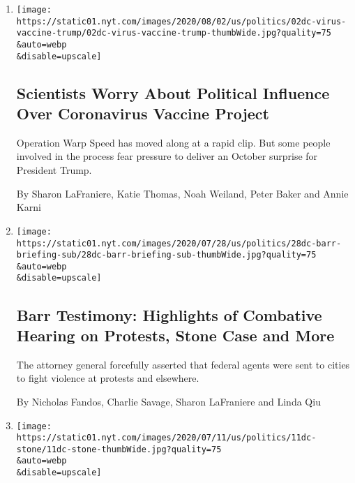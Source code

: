 \begin{enumerate}
\def\labelenumi{\arabic{enumi}.}
\item
  \href{/2020/08/02/us/politics/coronavirus-vaccine.html}{}

  \texttt{[image: https://static01.nyt.com/images/2020/08/02/us/politics/02dc-virus-vaccine-trump/02dc-virus-vaccine-trump-thumbWide.jpg?quality=75\\\&auto=webp\\\&disable=upscale]}

  \hypertarget{scientists-worry-about-political-influence-over-coronavirus-vaccine-project}{%
  \subsection{Scientists Worry About Political Influence Over
  Coronavirus Vaccine
  Project}\label{scientists-worry-about-political-influence-over-coronavirus-vaccine-project}}

  Operation Warp Speed has moved along at a rapid clip. But some people
  involved in the process fear pressure to deliver an October surprise
  for President Trump.

  By Sharon LaFraniere, Katie Thomas, Noah Weiland, Peter Baker and
  Annie Karni
\item
  \href{/2020/07/28/us/politics/william-barr-house-judiciary-hearing.html}{}

  \texttt{[image: https://static01.nyt.com/images/2020/07/28/us/politics/28dc-barr-briefing-sub/28dc-barr-briefing-sub-thumbWide.jpg?quality=75\\\&auto=webp\\\&disable=upscale]}

  \hypertarget{barr-testimony-highlights-of-combative-hearing-on-protests-stone-case-and-more}{%
  \subsection{Barr Testimony: Highlights of Combative Hearing on
  Protests, Stone Case and
  More}\label{barr-testimony-highlights-of-combative-hearing-on-protests-stone-case-and-more}}

  The attorney general forcefully asserted that federal agents were sent
  to cities to fight violence at protests and elsewhere.

  By Nicholas Fandos, Charlie Savage, Sharon LaFraniere and Linda Qiu
\item
  \href{/2020/07/11/us/politics/trump-roger-stone.html}{}

  \texttt{[image: https://static01.nyt.com/images/2020/07/11/us/politics/11dc-stone/11dc-stone-thumbWide.jpg?quality=75\\\&auto=webp\\\&disable=upscale]}


\end{enumerate}
